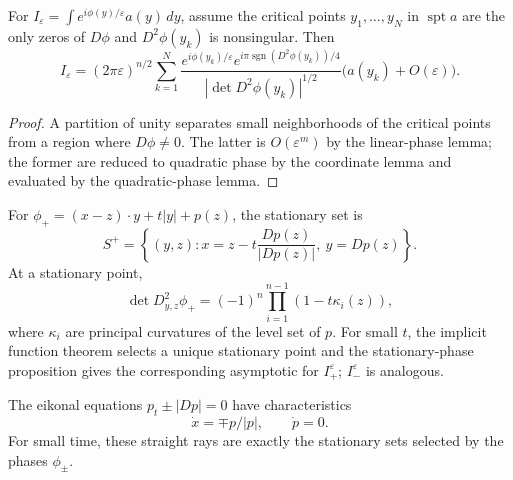 \begin{proposition}
\label{prop:stationary-phase-asymptotic-formula}

For $I_\varepsilon=\int e^{i\phi(y)/\varepsilon}a(y)\,dy$, assume the
critical points $y_1,\ldots,y_N$ in $\operatorname{spt}a$ are the only zeros
of $D\phi$ and $D^2\phi(y_k)$ is nonsingular. Then
\[
I_\varepsilon=(2\pi\varepsilon)^{n/2}\sum_{k=1}^N
\frac{e^{i\phi(y_k)/\varepsilon}e^{i\pi\operatorname{sgn}(D^2\phi(y_k))/4}}
{|\det D^2\phi(y_k)|^{1/2}}\big(a(y_k)+O(\varepsilon)\big).
\]
\end{proposition}

\begin{proof}
\sketch A partition of unity separates small neighborhoods of the critical
points from a region where $D\phi\ne0$. The latter is $O(\varepsilon^m)$ by
the linear-phase lemma; the former are reduced to quadratic phase by the
coordinate lemma and evaluated by the quadratic-phase lemma.
\end{proof}

\begin{example}
\label{ex:stationary-phase-wave-equation-continued}

For $\phi_+=(x-z)\cdot y+t|y|+p(z)$, the stationary set is
\[
S^+=\left\{(y,z):x=z-t\frac{Dp(z)}{|Dp(z)|},\ y=Dp(z)\right\}.
\]
At a stationary point,
\[
\det D^2_{y,z}\phi_+=(-1)^n\prod_{i=1}^{n-1}(1-t\kappa_i(z)),
\]
where $\kappa_i$ are principal curvatures of the level set of $p$. For small
$t$, the implicit function theorem selects a unique stationary point and the
stationary-phase proposition gives the corresponding asymptotic for
$I_+^\varepsilon$; $I_-^\varepsilon$ is analogous.
\end{example}

\begin{remark}
\label{rem:optics-stationary-phase-connection}

The eikonal equations $p_t\pm|Dp|=0$ have characteristics
\[
\dot x=\mp p/|p|,\qquad \dot p=0.
\]
For small time, these straight rays are exactly the stationary sets selected
by the phases $\phi_\pm$.
\end{remark}

